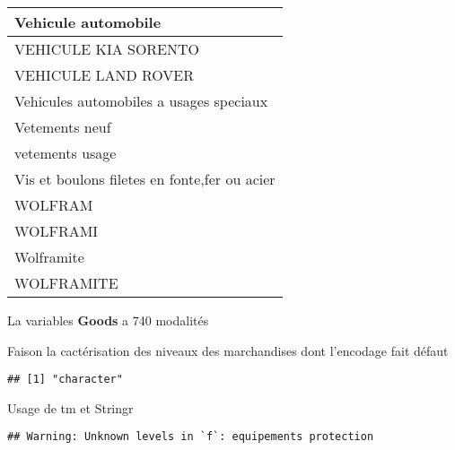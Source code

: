 \documentclass[
]{book}
\newenvironment{Shaded}{\begin{snugshade}}{\end{snugshade}}
\newcommand{\FunctionTok}[1]{\textcolor[rgb]{0.00,0.00,0.00}{#1}}
\newcommand{\NormalTok}[1]{#1}
\newcommand{\SpecialCharTok}[1]{\textcolor[rgb]{0.00,0.00,0.00}{#1}}
\begin{document}
\begin{table}
\begin{tabular}[t]{l}
\hline
Vehicule automobile\\
\hline
VEHICULE KIA SORENTO\\
\hline
VEHICULE LAND ROVER\\
\hline
Vehicules automobiles a usages speciaux\\
\hline
Vetements neuf\\
\hline
vetements usage\\
\hline
Vis et boulons filetes en fonte,fer ou acier\\
\hline
WOLFRAM\\
\hline
WOLFRAMI\\
\hline
Wolframite\\
\hline
WOLFRAMITE\\
\hline
\end{tabular}
\end{table}

La variables \textbf{Goods } a 740 modalités

Faison la cactérisation des niveaux des marchandises dont l'encodage fait défaut

\begin{Shaded}
\end{Shaded}

\begin{verbatim}
## [1] "character"
\end{verbatim}

Usage de tm et Stringr

\begin{verbatim}
## Warning: Unknown levels in `f`: equipements protection
\end{verbatim}
\end{document}
